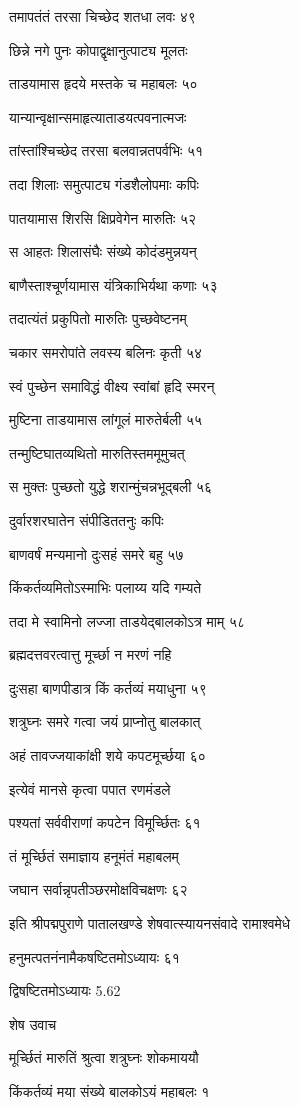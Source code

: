 तमापतंतं तरसा चिच्छेद शतधा लवः ४९

छिन्ने नगे पुनः कोपाद्वृक्षानुत्पाट्य मूलतः

ताडयामास हृदये मस्तके च महाबलः ५०

यान्यान्वृक्षान्समाहृत्याताडयत्पवनात्मजः

तांस्तांश्चिच्छेद तरसा बलवान्नतपर्वभिः ५१

तदा शिलाः समुत्पाट्य गंडशैलोपमाः कपिः

पातयामास शिरसि क्षिप्रवेगेन मारुतिः ५२

स आहतः शिलासंघैः संख्ये कोदंडमुन्नयन्

बाणैस्ताश्चूर्णयामास यंत्रिकाभिर्यथा कणाः ५३

तदात्यंतं प्रकुपितो मारुतिः पुच्छवेष्टनम्

चकार समरोपांते लवस्य बलिनः कृती ५४

स्वं पुच्छेन समाविद्धं वीक्ष्य स्वांबां हृदि स्मरन्

मुष्टिना ताडयामास लांगूलं मारुतेर्बली ५५

तन्मुष्टिघातव्यथितो मारुतिस्तममूमुचत्

स मुक्तः पुच्छतो युद्धे शरान्मुंचन्नभूद्बली ५६

दुर्वारशरघातेन संपीडिततनुः कपिः

बाणवर्षं मन्यमानो दुःसहं समरे बहु ५७

किंकर्तव्यमितोऽस्माभिः पलाय्य यदि गम्यते

तदा मे स्वामिनो लज्जा ताडयेद्बालकोऽत्र माम् ५८

ब्रह्मदत्तवरत्वात्तु मूर्च्छा न मरणं नहि

दुःसहा बाणपीडात्र किं कर्तव्यं मयाधुना ५९

शत्रुघ्नः समरे गत्वा जयं प्राप्नोतु बालकात्

अहं तावज्जयाकांक्षी शये कपटमूर्च्छया ६०

इत्येवं मानसे कृत्वा पपात रणमंडले

पश्यतां सर्ववीराणां कपटेन विमूर्च्छितः ६१

तं मूर्च्छितं समाज्ञाय हनूमंतं महाबलम्

जघान सर्वान्नृपतीञ्छरमोक्षविचक्षणः ६२

इति श्रीपद्मपुराणे पातालखण्डे शेषवात्स्यायनसंवादे रामाश्वमेधे

हनुमत्पतनंनामैकषष्टितमोऽध्यायः ६१

द्विषष्टितमोऽध्यायः 5.62

शेष उवाच

मूर्च्छितं मारुतिं श्रुत्वा शत्रुघ्नः शोकमाययौ

किंकर्तव्यं मया संख्ये बालकोऽयं महाबलः १

